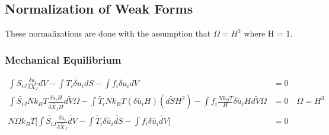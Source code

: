 \documentclass[12pt,3p]{article}
\numberwithin{equation}{section}
\begin{document}
\subsection{Normalization of Weak Forms}
These normalizations are done with the assumption that $\Omega = H^3$ where H = 1. 

\subsubsection{Mechanical Equilibrium} 
\begin{align*}
\int S_{iJ} \frac{\delta u_i}{\delta X_J} dV - \int T_i \delta u_i dS - \int f_i \delta u_i dV &= 0 \\
\int \tilde{S_{iJ}} N k_B T \frac{\delta \tilde{u_i} H}{\delta \tilde{X_J} H} d\tilde{V} \Omega - \int \tilde{T_i} N k_B T (\delta \tilde{u_{i}} H) (d\tilde{S} H^2) - \int f_i \frac{N k_B T}{H} \delta \tilde{u_i} H d\tilde{V} \Omega &= 0 \quad \Omega = H^3 \\
N \Omega k_B T \bigg[ \int \tilde{S_{iJ}}  \frac{\delta \tilde{u_i}}{\delta \tilde{X_J}} \tilde{dV} - \int \tilde{T_i} \delta \tilde{u_{i}} \tilde{dS} - \int f_i \delta \tilde{u_i} \tilde{dV} \bigg] &= 0 \\
\end{align*}

\end{document}
